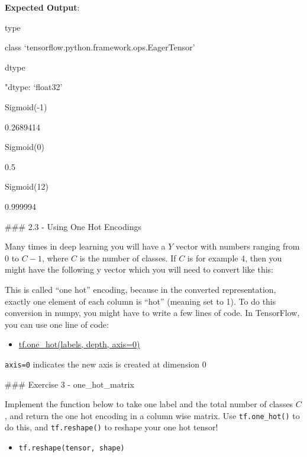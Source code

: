 \documentclass[11pt]{article}
\providecommand{\tightlist}{%
      \setlength{\itemsep}{0pt}\setlength{\parskip}{0pt}}
\begin{document}
    \textbf{Expected Output}:

type

class `tensorflow.python.framework.ops.EagerTensor'

dtype

"dtype: `float32'

Sigmoid(-1)

0.2689414

Sigmoid(0)

0.5

Sigmoid(12)

0.999994

    \#\#\# 2.3 - Using One Hot Encodings

Many times in deep learning you will have a \(Y\) vector with numbers
ranging from \(0\) to \(C-1\), where \(C\) is the number of classes. If
\(C\) is for example 4, then you might have the following y vector which
you will need to convert like this:

This is called ``one hot'' encoding, because in the converted
representation, exactly one element of each column is ``hot'' (meaning
set to 1). To do this conversion in numpy, you might have to write a few
lines of code. In TensorFlow, you can use one line of code:

\begin{itemize}
\tightlist
\item
  \href{https://www.tensorflow.org/api_docs/python/tf/one_hot}{tf.one\_hot(labels,
  depth, axis=0)}
\end{itemize}

\texttt{axis=0} indicates the new axis is created at dimension 0

\#\#\# Exercise 3 - one\_hot\_matrix

Implement the function below to take one label and the total number of
classes \(C\), and return the one hot encoding in a column wise matrix.
Use \texttt{tf.one\_hot()} to do this, and \texttt{tf.reshape()} to
reshape your one hot tensor!

\begin{itemize}
\tightlist
\item
  \texttt{tf.reshape(tensor,\ shape)}
\end{itemize}
\end{document}
